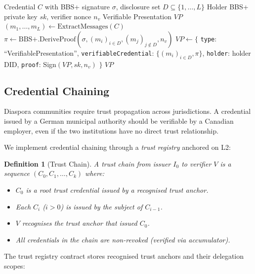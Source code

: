 \documentclass[11pt,a4paper]{article}
\newtheorem{definition}[theorem]{Definition}
\begin{document}
\begin{algorithm}[H]
\caption{Selective Disclosure Presentation}
\label{alg:selective-disclosure}
\begin{algorithmic}[1]
\Require Credential $C$ with BBS+ signature $\sigma$, disclosure set $D \subseteq \{1,\ldots,L\}$
\Require Holder BBS+ private key $sk$, verifier nonce $n_v$
\Ensure Verifiable Presentation $VP$
    \State $(m_1, \ldots, m_L) \gets \text{ExtractMessages}(C)$
    \State $\pi \gets \text{BBS+.DeriveProof}(\sigma, (m_i)_{i \in D}, (m_j)_{j \notin D}, n_v)$
    \State $VP \gets \{$
    \State \quad \texttt{type}: ``VerifiablePresentation'',
    \State \quad \texttt{verifiableCredential}: $\{(m_i)_{i \in D}, \pi\}$,
    \State \quad \texttt{holder}: holder DID,
    \State \quad \texttt{proof}: Sign$(VP, sk, n_v)$
    \State $\}$
    \Return $VP$
\EndFunction
\end{algorithmic}
\end{algorithm}

\subsection{Credential Chaining}

Diaspora communities require trust propagation across jurisdictions. A credential
issued by a German municipal authority should be verifiable by a Canadian employer,
even if the two institutions have no direct trust relationship.

We implement credential chaining through a \emph{trust registry} anchored on L2:

\begin{definition}[Trust Chain]
A trust chain from issuer $I_0$ to verifier $V$ is a sequence
$(C_0, C_1, \ldots, C_k)$ where:
\begin{itemize}
    \item $C_0$ is a root trust credential issued by a recognised trust anchor.
    \item Each $C_i$ ($i > 0$) is issued by the subject of $C_{i-1}$.
    \item $V$ recognises the trust anchor that issued $C_0$.
    \item All credentials in the chain are non-revoked (verified via accumulator).
\end{itemize}
\end{definition}

The trust registry contract stores recognised trust anchors and their delegation
scopes:
\end{document}
